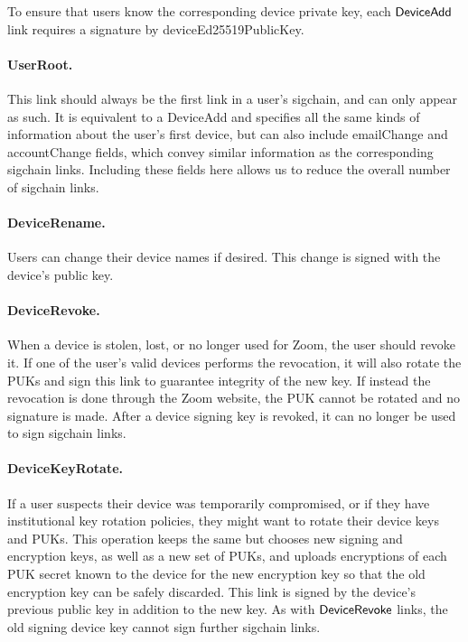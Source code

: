 To ensure that users know the corresponding device private key, each $\mathsf{DeviceAdd}{}$ link requires a
signature by \textsf{deviceEd25519PublicKey}.

\paragraph{UserRoot.} This link should always be the first link in a user's sigchain, and can only
appear as such. It is equivalent to a DeviceAdd and specifies all the same kinds of information
about the user's first device, but can also include \textsf{emailChange} and \textsf{accountChange}
fields, which convey similar information as the corresponding sigchain links. Including these fields
here allows us to reduce the overall number of sigchain links.

\paragraph{DeviceRename.} Users can change their device names if desired. This change is signed with
the device's public key.

\paragraph{DeviceRevoke.} When a device is stolen, lost, or no longer used for Zoom, the user should
revoke it. If one of the user's valid devices performs the revocation, it will also rotate the PUKs
and sign this link to guarantee integrity of the new key. If instead the revocation is done through
the Zoom website, the PUK cannot be rotated and no signature is made. After a device signing key is
revoked, it can no longer be used to sign sigchain links.

\paragraph{DeviceKeyRotate.} If a user suspects their device was temporarily compromised, or if they
have institutional key rotation policies, they might want to rotate their device keys and PUKs. This
operation keeps the same \deviceid but chooses new signing and encryption keys, as well as a new set
of PUKs, and uploads encryptions of each PUK secret known to the device for the new encryption key
so that the old encryption key can be safely discarded. This link is signed by the device's previous
public key in addition to the new key. As with $\mathsf{DeviceRevoke}{}$ links, the old signing device key
cannot sign further sigchain links.

